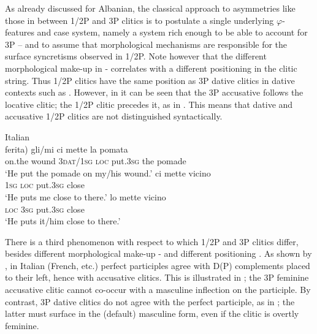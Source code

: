 \documentclass[output=paper,colorlinks,citecolor=brown]{./langscibook}
\begin{document}
As already discussed for Albanian, the classical approach to asymmetries like those in  between 1/2P and 3P clitics is to postulate a single underlying $\varphi ${}-features and case system, namely a system rich enough to be able to account for 3P – and to assume that morphological mechanisms are responsible for the surface syncretisms observed in 1/2P. Note however that the different morphological make-up in - correlates with a different positioning in the clitic string. Thus 1/2P clitics have the same position as 3P dative clitics in dative contexts such as . However, in  it can be seen that the 3P accusative follows the locative clitic; the 1/2P clitic precedes it, as in . This means that dative and accusative 1/2P clitics are not distinguished syntactically.

\ea%
    \label{ex:manzini:13}
    Italian\\
    \ea\label{ex:manzini:13a} 
     {ferita)}   {gli/mi}    {ci}   {mette} {la} {pomata}\\
        on.the wound   \textsc{3dat/1sg}   \textsc{loc}   put.\textsc{3sg} the pomade\\
    \glt ‘He put the pomade on my/his wound.’
    \ex\label{ex:manzini:13b} 
      {ci}   {mette}   {vicino}\\
        \textsc{1sg}  \textsc{loc}  put.\textsc{3sg} close\\
    \glt ‘He puts me close to there.’
    \ex\label{ex:manzini:13c} 
      {lo}  {mette}   {vicino}\\
        \textsc{loc}  \textsc{3sg}   put.\textsc{3sg} close\\
    \glt ‘He puts it/him close to there.’
    \z
\z

There is a third phenomenon with respect to which 1/2P and 3P clitics differ, besides different morphological make-up - and different positioning . As shown by \citet{Kayne1989}, in Italian (French, etc.) perfect participles agree with D(P) complements placed to their left, hence with accusative clitics. This is illustrated in ; the 3P feminine accusative clitic cannot co-occur with a masculine inflection on the participle. By contrast, 3P dative clitics do not agree with the perfect participle, as in ; the latter must surface in the (default) masculine form, even if the clitic is overtly feminine.
\end{document}
